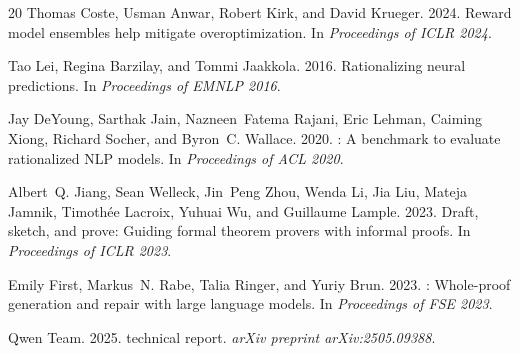 \documentclass[11pt]{article}
\begin{document}
\begin{thebibliography}{20}
Thomas Coste, Usman Anwar, Robert Kirk, and David Krueger. 2024.
\newblock Reward model ensembles help mitigate overoptimization.
\newblock In \emph{Proceedings of ICLR 2024}.

Tao Lei, Regina Barzilay, and Tommi Jaakkola. 2016.
\newblock Rationalizing neural predictions.
\newblock In \emph{Proceedings of EMNLP 2016}.

Jay DeYoung, Sarthak Jain, Nazneen~Fatema Rajani, Eric Lehman, Caiming Xiong, Richard Socher, and Byron~C. Wallace. 2020.
: A benchmark to evaluate rationalized {NLP} models.
\newblock In \emph{Proceedings of ACL 2020}.

Albert~Q. Jiang, Sean Welleck, Jin~Peng Zhou, Wenda Li, Jia Liu, Mateja Jamnik, Timoth\'{e}e Lacroix, Yuhuai Wu, and Guillaume Lample. 2023.
\newblock Draft, sketch, and prove: Guiding formal theorem provers with informal proofs.
\newblock In \emph{Proceedings of ICLR 2023}.

Emily First, Markus~N. Rabe, Talia Ringer, and Yuriy Brun. 2023.
: Whole-proof generation and repair with large language models.
\newblock In \emph{Proceedings of FSE 2023}.

Qwen Team. 2025.
 technical report.
\newblock \emph{arXiv preprint arXiv:2505.09388}.

\end{thebibliography}
\end{document}

